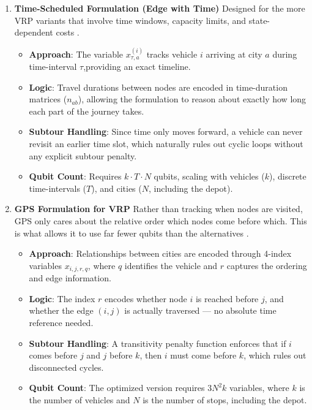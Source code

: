 \documentclass[a4paper]{report}
\begin{document}
{\begin{itemize}
\begin{enumerate}
    \item \textbf{Time-Scheduled Formulation (Edge with Time)}
    Designed for the more VRP variants that involve time windows, 
    capacity limits, and state-dependent costs \cite{irie2019quantum}.
    \begin{itemize}
        \item \textbf{Approach}: The variable $x_{\tau,a}^{(i)}$ tracks vehicle 
        $i$ arriving at city $a$ during time-interval $\tau$,providing an exact timeline.
        \item \textbf{Logic}: Travel durations between nodes are encoded in 
        time-duration matrices ($n_{ab}$), allowing the formulation to reason 
        about exactly how long each part of the journey takes.
        \item \textbf{Subtour Handling}: Since time only moves forward, a vehicle 
        can never revisit an earlier time slot, which naturally rules out cyclic 
        loops without any explicit subtour penalty.
        \item \textbf{Qubit Count}: Requires $k \cdot T \cdot N$ qubits, scaling 
        with vehicles ($k$), discrete time-intervals ($T$), and cities ($N$, 
        including the depot).
    \end{itemize}

    \item \textbf{GPS Formulation for VRP}
    Rather than tracking when nodes are visited, GPS only cares about the relative 
    order which nodes come before which. This is what allows it to use far 
    fewer qubits than the alternatives \cite{bermejo2022gps}.
    \begin{itemize}
        \item \textbf{Approach}: Relationships between cities are encoded through 
        4-index variables $x_{i,j,r,q}$, where $q$ identifies the vehicle and 
        $r$ captures the ordering and edge information.
        \item \textbf{Logic}: The index $r$ encodes whether node $i$ is reached 
        before $j$, and whether the edge $(i,j)$ is actually traversed — no 
        absolute time reference needed.
        \item \textbf{Subtour Handling}: A transitivity penalty function enforces 
        that if $i$ comes before $j$ and $j$ before $k$, then $i$ must come 
        before $k$, which rules out disconnected cycles.
        \item \textbf{Qubit Count}: The optimized version requires $3N^2k$ 
        variables, where $k$ is the number of vehicles and $N$ is the number of 
        stops, including the depot.
    \end{itemize}


\end{enumerate}
\end{itemize}}
\end{document}
